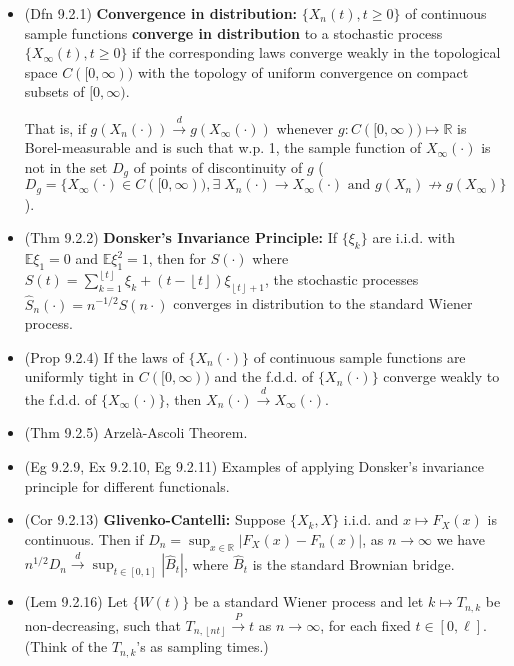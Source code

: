 \documentclass[twoside]{article}
\newcommand{\dis}{\displaystyle}
\def\lf{\left\lfloor}
\def\rf{\right\rfloor}
\newcommand\bbE{\mathbb{E}}
\newcommand\bbR{\mathbb{R}}
\newcommand\goesto{\rightarrow}
\begin{document}
\begin{itemize}
\item (Dfn 9.2.1) \textbf{Convergence in distribution:} $\{ X_n(t), t \geq 0\}$ of continuous sample functions \textbf{converge in distribution} to a stochastic process $\{X_\infty(t), t \geq 0 \}$ if the corresponding laws converge weakly in the topological space $C([0,\infty))$ with the topology of uniform convergence on compact subsets of $[0,\infty)$.

That is, if $g(X_n(\cdot)) \stackrel{d}{\goesto} g(X_\infty(\cdot))$ whenever $g: C([0,\infty)) \mapsto \bbR$ is Borel-measurable and is such that w.p. 1, the sample function of $X_\infty(\cdot)$ is not in the set $D_g$ of points of discontinuity of $g$ ($D_g = \{ X_\infty(\cdot) \in C([0,\infty)), \exists\; X_n(\cdot) \goesto X_\infty(\cdot) \text{ and } g(X_n) \not\goesto g(X_\infty) \}$).

\item (Thm 9.2.2) \textbf{Donsker's Invariance Principle:} If $\{ \xi_k\}$ are i.i.d. with $\bbE \xi_1 = 0$ and $\bbE \xi_1^2 = 1$, then for $S(\cdot)$ where $S(t) = \dis\sum_{k=1}^{\lf t \rf} \xi_k + (t - \lf t \rf)\xi_{\lf t \rf + 1}$, the stochastic processes $\widehat{S}_n(\cdot) = n^{-1/2}S(n\cdot)$ converges in distribution to the standard Wiener process.

\item (Prop 9.2.4) If the laws of $\{ X_n(\cdot)\}$ of continuous sample functions are uniformly tight in $C([0,\infty))$ and the f.d.d. of $\{ X_n(\cdot)\}$ converge weakly to the f.d.d. of $\{ X_\infty(\cdot)\}$, then $X_n(\cdot) \stackrel{d}{\goesto} X_\infty(\cdot)$.

\item (Thm 9.2.5) Arzel\`{a}-Ascoli Theorem.

\item (Eg 9.2.9, Ex 9.2.10, Eg 9.2.11) Examples of applying Donsker's invariance principle for different functionals.

\item (Cor 9.2.13) \textbf{Glivenko-Cantelli:} Suppose $\{ X_k, X\}$ i.i.d. and $x \mapsto F_X(x)$ is continuous. Then if $D_n = \dis\sup_{x \in \bbR} |F_X(x) - F_n(x)|$, as $n \goesto \infty$ we have $n^{1/2}D_n \stackrel{d}{\goesto} \dis\sup_{t \in [0,1]} |\widehat{B}_t|$, where $\widehat{B}_t$ is the standard Brownian bridge.

\item (Lem 9.2.16) Let $\{ W(t)\}$ be a standard Wiener process and let $k \mapsto T_{n,k}$ be non-decreasing, such that $T_{n, \lf nt \rf} \stackrel{P}{\goesto} t$ as $n \goesto \infty$, for each fixed $t \in [0,\ell]$. (Think of the $T_{n,k}$'s as sampling times.)


\end{itemize}
\end{document}
